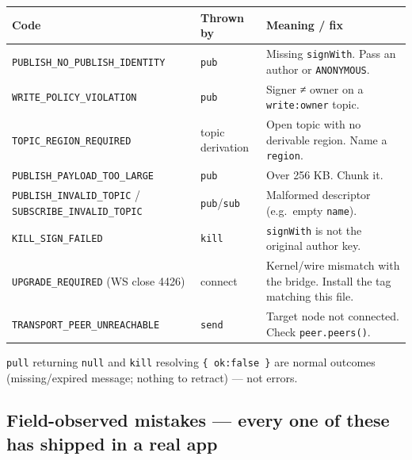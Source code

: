 \documentclass[
  nobib]{tufte-handout}
\newcounter{none} %
\begin{document}
{\def\LTcaptype{none} %
\begin{longtable}[]{@{}
  >{\raggedright\arraybackslash}p{}
  >{\raggedright\arraybackslash}p{}
  >{\raggedright\arraybackslash}p{}@{}}
\toprule\noalign{}
\begin{minipage}[b]{\linewidth}\raggedright
Code
\end{minipage} & \begin{minipage}[b]{\linewidth}\raggedright
Thrown by
\end{minipage} & \begin{minipage}[b]{\linewidth}\raggedright
Meaning / fix
\end{minipage} \\
\midrule\noalign{}
\endhead
\bottomrule\noalign{}
\endlastfoot
\texttt{PUBLISH\_NO\_PUBLISH\_IDENTITY} & \texttt{pub} & Missing
\texttt{signWith}. Pass an author or \texttt{ANONYMOUS}. \\
\texttt{WRITE\_POLICY\_VIOLATION} & \texttt{pub} & Signer ≠ owner on a
\texttt{write:\textquotesingle{}owner\textquotesingle{}} topic. \\
\texttt{TOPIC\_REGION\_REQUIRED} & topic derivation & Open topic with no
derivable region. Name a \texttt{region}. \\
\texttt{PUBLISH\_PAYLOAD\_TOO\_LARGE} & \texttt{pub} & Over 256 KB.
Chunk it. \\
\texttt{PUBLISH\_INVALID\_TOPIC} / \texttt{SUBSCRIBE\_INVALID\_TOPIC} &
\texttt{pub}/\texttt{sub} & Malformed descriptor (e.g.~empty
\texttt{name}). \\
\texttt{KILL\_SIGN\_FAILED} & \texttt{kill} & \texttt{signWith} is not
the original author key. \\
\texttt{UPGRADE\_REQUIRED} (WS close 4426) & connect & Kernel/wire
mismatch with the bridge. Install the tag matching this file. \\
\texttt{TRANSPORT\_PEER\_UNREACHABLE} & \texttt{send} & Target node not
connected. Check \texttt{peer.peers()}. \\
\end{longtable}
}

\texttt{pull} returning \texttt{null} and \texttt{kill} resolving
\texttt{\{\ ok:false\ \}} are normal outcomes (missing/expired message;
nothing to retract) --- not errors.

\subsection{Field-observed mistakes --- every one of these has shipped
in a real
app}\label{field-observed-mistakes-every-one-of-these-has-shipped-in-a-real-app}
\end{document}
